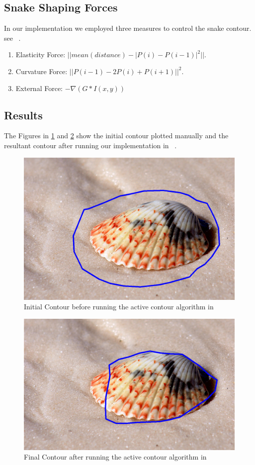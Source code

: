 \documentclass[letterpaper, 12 pt, conference ,onecolumn]{ieeeconf}  %
\begin{document}
 
\subsection{Snake Shaping Forces} 
In our implementation we employed three measures to control the snake contour. see ~.
\begin{enumerate}
\item Elasticity Force: $ || mean(distance) - |P(i)-P(i-1)|^2 ||$.
\item Curvature Force: $ || P(i-1) - 2P(i) + P(i+1) ||^2 $.
\item External Force: $ - \nabla ( G * I(x,y) )$
\end{enumerate} 


\subsection{Results}
The Figures in \ref{fig:snake-before} and \ref{fig:snake-after} show the initial contour plotted manually and the resultant contour after running our implementation in ~.
\begin{figure}[h!]
\includegraphics[width=0.4\paperwidth]{snake/snake-before.jpg}
\caption{Initial Contour before running the active contour algorithm in ~ }
\label{fig:snake-before}
\end{figure}

\begin{figure}[h!]
\includegraphics[width=0.4\paperwidth]{snake/snake-results.jpg}
\caption{Final Contour after running the active contour algorithm in ~ }
\label{fig:snake-after}
\end{figure}
\end{document}

